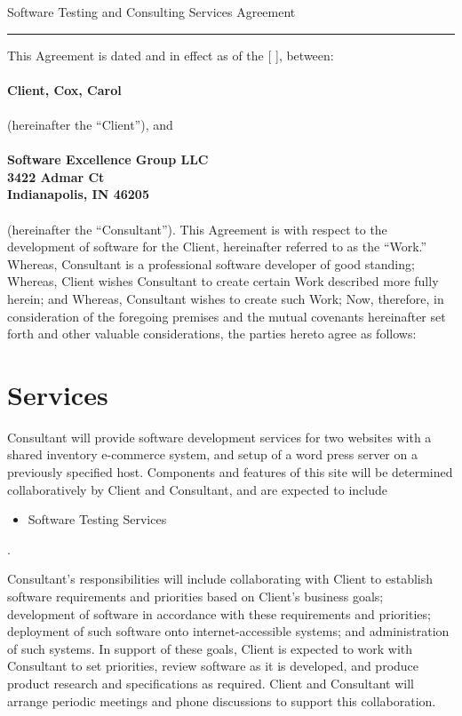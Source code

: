 \documentclass[10pt]{article}
\begin{document}
\begin{center}
{\Large Software Testing and Consulting Services Agreement}
\end{center}

\hrule height .1mm

\vspace{.5cm}

\noindent This Agreement is dated and in effect as of the [     ], between:\\
\\
{\bf Client, Cox, Carol \\}
\\
(hereinafter the ``Client''), and\\
\\
{\bf Software Excellence Group  LLC\\
3422 Admar Ct\\
Indianapolis, IN 46205\\}
\\
(hereinafter the ``Consultant'').  This Agreement is with respect to the
development of software for the Client, hereinafter referred to as the
``Work.''   Whereas, Consultant is a professional software developer of good
standing; Whereas, Client wishes Consultant to create certain Work described
more fully herein; and Whereas, Consultant wishes to create such Work; Now,
therefore, in consideration of the foregoing premises and the mutual
covenants hereinafter set forth and other valuable considerations, the
parties hereto agree as follows: 


\section{Services}

Consultant will provide software development services for two websites with a shared inventory e-commerce system, and setup of a word press server on a previously specified host.  Components and features of this site will
be determined collaboratively by Client and Consultant, and are expected to
include 
\begin{itemize}
	\item Software Testing Services
\end{itemize}.

Consultant's responsibilities will include collaborating with Client to
establish software requirements and priorities based on Client's business
goals; development of software in accordance with these requirements and
priorities; deployment of such software onto internet-accessible systems;
and administration of such systems.  In support of these goals, Client is
expected to work with Consultant to set priorities, review software as it is
developed, and produce product research and specifications as required.
Client and Consultant will arrange periodic meetings and phone discussions
to support this collaboration.
\end{document}
